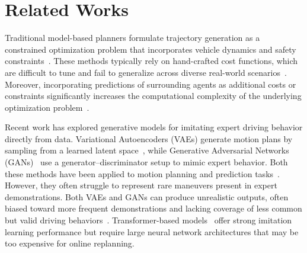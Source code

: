 \documentclass[conference]{IEEEtran}
\begin{document}
\section{Related Works}
Traditional model-based planners formulate trajectory generation as a constrained optimization problem that incorporates vehicle dynamics and safety constraints~\cite{ad_constraints}. These methods typically rely on hand-crafted cost functions, which are difficult to tune and fail to generalize across diverse real-world scenarios~\cite{cc,modeling_dynamics}. Moreover, incorporating predictions of surrounding agents as additional costs or constraints significantly increases the computational complexity of the underlying optimization problem~\cite{trajectron}.

Recent work has explored generative models for imitating expert driving behavior directly from data. Variational Autoencoders (VAEs) generate motion plans by sampling from a learned latent space~\cite{vae}, while Generative Adversarial Networks (GANs)~\cite{gans} use a generator–discriminator setup to mimic expert behavior. Both these methods have been applied to motion planning and prediction tasks~\cite{goal_gan,vae_ad}. However, they often struggle to represent rare maneuvers present in expert demonstrations. Both VAEs and GANs can produce unrealistic outputs, often biased toward more frequent demonstrations and lacking coverage of less common but valid driving behaviors~\cite{vae_bad}. Transformer-based models~\cite{mtr} offer strong imitation learning performance but require large neural network architectures that may be too expensive for online replanning.


\end{document}
